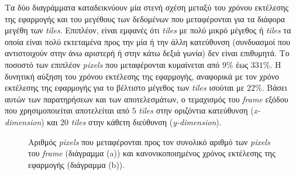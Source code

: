 Τα δύο διαγράμματα καταδεικνύουν μία στενή σχέση μεταξύ του χρόνου εκτέλεσης της εφαρμογής και του μεγέθους των δεδομένων που μεταφέρονται για τα διάφορα μεγέθη των \textsl{tiles}. Επιπλέον, είναι εμφανές ότι \textsl{tiles} με πολύ μικρό μέγεθος ή \textsl{tiles} τα οποία είναι πολύ εκτεταμένα προς την μία ή την άλλη κατεύθυνση (συνδυασμοί που αντιστοιχούν στην άνω αριστερή ή στην κάτω δεξιά γωνία) δεν είναι επιθυμητά. Το ποσοστό των επιπλέον \textsl{pixels} που μεταφέρονται κυμαίνεται από \(9\%\) έως \(331\%\). Η δυνητική αύξηση του χρόνου εκτέλεσης της εφαρμογής, αναφορικά με τον χρόνο εκτέλεσης της εφαρμογής για το βέλτιστο μέγεθος των \textsl{tiles} ισούται με \(22\%\). Βάσει αυτών των παρατηρήσεων και των αποτελεσμάτων, ο τεμαχισμός του \textsl{frame} εξόδου που χρησιμοποιείται αποτελείται από \(5\) \textsl{tiles} στην οριζόντια κατεύθυνση (\textsl{x-dimension}) και \(20\) \textsl{tiles} στην κάθετη διεύθυνση (\textsl{y-dimension}).
\begin{figure}
\hspace{-0.5in}
\hspace{-0.1in}
\caption{Αριθμός \textsl{pixels} που μεταφέρονται προς τον συνολικό αριθμό των \textsl{pixels} του \textsl{frame} (διάγραμμα (a)) και κανονικοποιημένος χρόνος εκτέλεσης της εφαρμογής (διάγραμμα (b)).}
\label{figure:fig51}
\end{figure}
